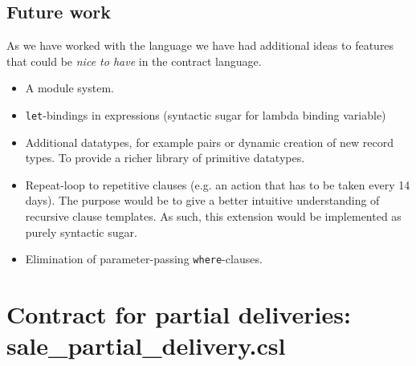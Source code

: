\documentclass[10pt,a4paper,final,oneside,openany,article]{memoir}
\begin{document}

\section{Future work}
As we have worked with the language we have had additional ideas to
features that could be \textit{nice to have} in the contract language.

\begin{itemize}
\item A module system.
\item \lstinline{let}-bindings in expressions (syntactic sugar for
  lambda binding variable)
\item Additional datatypes, for example pairs or dynamic creation of
  new record types. To provide a richer library of primitive
  datatypes.
\item Repeat-loop to repetitive clauses (e.g. an action that has to be
  taken every 14 days). The purpose would be to give a better
  intuitive understanding of recursive clause templates. As such, this
  extension would be implemented as purely syntactic sugar.
\item Elimination of parameter-passing \lstinline{where}-clauses.
\end{itemize}

\printbibliography


\newpage
    \appendix
\chapter{Contract for partial deliveries: sale\_partial\_delivery.csl}
\label{chap:sale_partial_delivery}

\end{document}

